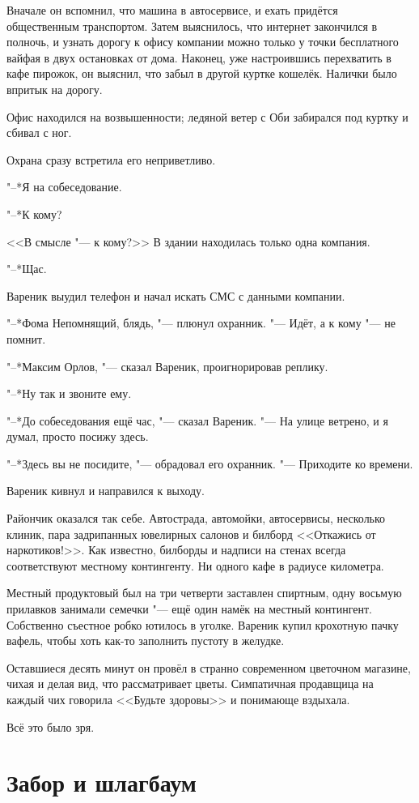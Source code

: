 Вначале он вспомнил, что машина в автосервисе, и ехать придётся общественным транспортом.
Затем выяснилось, что интернет закончился в полночь, и узнать дорогу к офису компании можно только у точки бесплатного вайфая в двух остановках от дома.
Наконец, уже настроившись перехватить в кафе пирожок, он выяснил, что забыл в другой куртке кошелёк.
Налички было впритык на дорогу.

Офис находился на возвышенности;
ледяной ветер с Оби забирался под куртку и сбивал с ног.

Охрана сразу встретила его неприветливо.

"--*Я на собеседование.

"--*К кому?

<<В смысле "--- к кому?>>
В здании находилась только одна компания.

"--*Щас.

Вареник выудил телефон и начал искать СМС с данными компании.

"--*Фома Непомнящий, блядь, "--- плюнул охранник.
"--- Идёт, а к кому "--- не помнит.

"--*Максим Орлов, "--- сказал Вареник, проигнорировав реплику.

"--*Ну так и звоните ему.

"--*До собеседования ещё час, "--- сказал Вареник.
"--- На улице ветрено, и я думал, просто посижу здесь.

"--*Здесь вы не посидите, "--- обрадовал его охранник.
"--- Приходите ко времени.

Вареник кивнул и направился к выходу.

Райончик оказался так себе.
Автострада, автомойки, автосервисы, несколько клиник, пара задрипанных ювелирных салонов и билборд <<Откажись от наркотиков!>>.
Как известно, билборды и надписи на стенах всегда соответствуют местному контингенту.
Ни одного кафе в радиусе километра.

Местный продуктовый был на три четверти заставлен спиртным, одну восьмую прилавков занимали семечки "--- ещё один намёк на местный контингент.
Собственно съестное робко ютилось в уголке.
Вареник купил крохотную пачку вафель, чтобы хоть как-то заполнить пустоту в желудке.

Оставшиеся десять минут он провёл в странно современном цветочном магазине, чихая и делая вид, что рассматривает цветы.
Симпатичная продавщица на каждый чих говорила <<Будьте здоровы>> и понимающе вздыхала.

Всё это было зря.

\section{Забор и шлагбаум}

